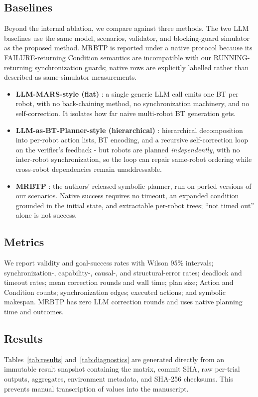 \documentclass[journal]{IEEEtran}
\begin{document}
\subsection{Baselines}
\label{sec:baselines}
Beyond the internal ablation, we compare against three methods. The two LLM baselines use the same model, scenarios, validator, and blocking-guard simulator as the proposed method. MRBTP is reported under a native protocol because its FAILURE-returning Condition semantics are incompatible with our RUNNING-returning synchronization guards; native rows are explicitly labelled rather than described as same-simulator measurements.
\begin{itemize}
    \item \textbf{LLM-MARS-style (flat)} \cite{lykov2023llmmars}: a single generic LLM call emits one BT per robot, with no back-chaining method, no synchronization machinery, and no self-correction. It isolates how far naive multi-robot BT generation gets.
    \item \textbf{LLM-as-BT-Planner-style (hierarchical)} \cite{ao2025llmasbtplanner}: hierarchical decomposition into per-robot action lists, BT encoding, and a recursive self-correction loop on the verifier's feedback - but robots are planned \emph{independently}, with no inter-robot synchronization, so the loop can repair same-robot ordering while cross-robot dependencies remain unaddressable.
    \item \textbf{MRBTP} \cite{cai2025mrbtp}: the authors' released symbolic planner, run on ported versions of our scenarios. Native success requires no timeout, an expanded condition grounded in the initial state, and extractable per-robot trees; ``not timed out'' alone is not success.
\end{itemize}

\subsection{Metrics}
We report validity and goal-success rates with Wilson 95\% intervals; synchronization-, capability-, causal-, and structural-error rates; deadlock and timeout rates; mean correction rounds and wall time; plan size; Action and Condition counts; synchronization edges; executed actions; and symbolic makespan. MRBTP has zero LLM correction rounds and uses native planning time and outcomes.

\subsection{Results}
Tables~\ref{tab:results} and~\ref{tab:diagnostics} are generated directly from an immutable result snapshot containing the matrix, commit SHA, raw per-trial outputs, aggregates, environment metadata, and SHA-256 checksums. This prevents manual transcription of values into the manuscript.
\end{document}
